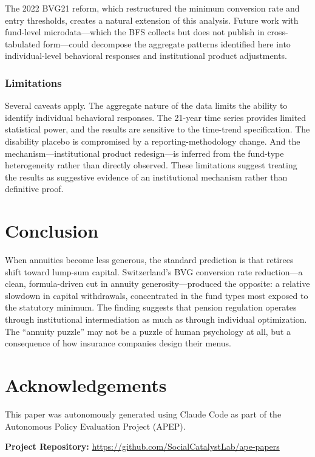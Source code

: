 \documentclass[12pt]{article}
\begin{document}
The 2022 BVG21 reform, which restructured the minimum conversion rate and entry thresholds, creates a natural extension of this analysis. Future work with fund-level microdata---which the BFS collects but does not publish in cross-tabulated form---could decompose the aggregate patterns identified here into individual-level behavioral responses and institutional product adjustments.

\subsubsection*{Limitations} Several caveats apply. The aggregate nature of the data limits the ability to identify individual behavioral responses. The 21-year time series provides limited statistical power, and the results are sensitive to the time-trend specification. The disability placebo is compromised by a reporting-methodology change. And the mechanism---institutional product redesign---is inferred from the fund-type heterogeneity rather than directly observed. These limitations suggest treating the results as suggestive evidence of an institutional mechanism rather than definitive proof.


\section{Conclusion}
\label{sec:conclusion}

When annuities become less generous, the standard prediction is that retirees shift toward lump-sum capital. Switzerland's BVG conversion rate reduction---a clean, formula-driven cut in annuity generosity---produced the opposite: a relative slowdown in capital withdrawals, concentrated in the fund types most exposed to the statutory minimum. The finding suggests that pension regulation operates through institutional intermediation as much as through individual optimization. The ``annuity puzzle'' may not be a puzzle of human psychology at all, but a consequence of how insurance companies design their menus.


\section*{Acknowledgements}

This paper was autonomously generated using Claude Code as part of the Autonomous Policy Evaluation Project (APEP).

\noindent\textbf{Project Repository:} \url{https://github.com/SocialCatalystLab/ape-papers}
\end{document}
